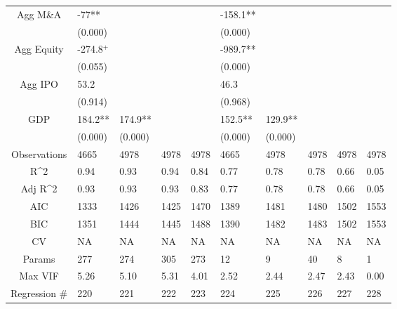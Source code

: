\documentclass{article}
\begin{document}
\begin{table}[H]
\begin{tabular}{|clllllllll|}
  Agg M\&A & -77** &  &  &  & -158.1** &  &  &  &  \\
   & (0.000) &  &  &  & (0.000) &  &  &  &  \\
  Agg Equity & -274.8$^{+}$ &  &  &  & -989.7** &  &  &  &  \\
   & (0.055) &  &  &  & (0.000) &  &  &  &  \\
  Agg IPO & 53.2 &  &  &  & 46.3 &  &  &  &  \\
   & (0.914) &  &  &  & (0.968) &  &  &  &  \\
  GDP & 184.2** & 174.9** &  &  & 152.5** & 129.9** &  &  &  \\
   & (0.000) & (0.000) &  &  & (0.000) & (0.000) &  &  &  \\
  \hline
 Observations & 4665 & 4978 & 4978 & 4978 & 4665 & 4978 & 4978 & 4978 & 4978 \\
  R^2 & 0.94 & 0.93 & 0.94 & 0.84 & 0.77 & 0.78 & 0.78 & 0.66 & 0.05 \\
  Adj R^2 & 0.93 & 0.93 & 0.93 & 0.83 & 0.77 & 0.78 & 0.78 & 0.66 & 0.05 \\
  AIC & 1333 & 1426 & 1425 & 1470 & 1389 & 1481 & 1480 & 1502 & 1553 \\
  BIC & 1351 & 1444 & 1445 & 1488 & 1390 & 1482 & 1483 & 1502 & 1553 \\
  CV & NA & NA & NA & NA & NA & NA & NA & NA & NA \\
  Params & 277 & 274 & 305 & 273 & 12 & 9 & 40 & 8 & 1 \\
  Max VIF & 5.26 & 5.10 & 5.31 & 4.01 & 2.52 & 2.44 & 2.47 & 2.43 & 0.00 \\
  Regression \# & 220 & 221 & 222 & 223 & 224 & 225 & 226 & 227 & 228 \\
   \hline
\end{tabular}

\end{table}
\end{document}

